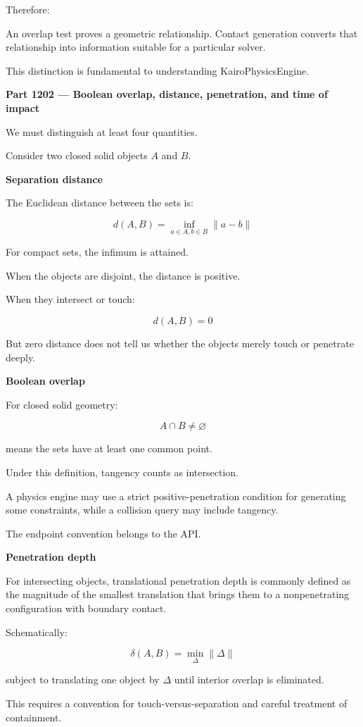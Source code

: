 Therefore:

An overlap test proves a geometric relationship. Contact generation converts that relationship into information suitable for a particular solver.

This distinction is fundamental to understanding KairoPhysicsEngine.

\textbf{Part 1202 --- Boolean overlap, distance, penetration, and time of impact}

We must distinguish at least four quantities.

Consider two closed solid objects \(A\) and \(B\).

\textbf{Separation distance}

The Euclidean distance between the sets is:

\[
\boxed{ d(A,B)=\inf_{a\in A,b\in B}\|a-b\| }
\]

For compact sets, the infimum is attained.

When the objects are disjoint, the distance is positive.

When they intersect or touch:

\[
d(A,B)=0
\]

But zero distance does not tell us whether the objects merely touch or penetrate deeply.

\textbf{Boolean overlap}

For closed solid geometry:

\[
\boxed{ A\cap B\ne\varnothing }
\]

means the sets have at least one common point.

Under this definition, tangency counts as intersection.

A physics engine may use a strict positive-penetration condition for generating some constraints, while a collision query may include tangency.

The endpoint convention belongs to the API.

\textbf{Penetration depth}

For intersecting objects, translational penetration depth is commonly defined as the magnitude of the smallest translation that brings them to a nonpenetrating configuration with boundary contact.

Schematically:

\[
\boxed{ \delta(A,B)= \min_{\Delta}\|\Delta\| }
\]

subject to translating one object by \(\Delta\) until interior overlap is eliminated.

This requires a convention for touch-versus-separation and careful treatment of containment.

